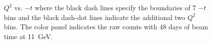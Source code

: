 \begin{figure}[!ht]
 \begin{center}
   \caption[$Q^{2}$ vs. $-t$]{\footnotesize{$Q^{2}$ vs. $-t$ where the black
dash lines specify the boundaries of 7 $-t$ bins and the black dash-dot lines
indicate the additional two $Q^{2}$ bins.  The color panel indicates the raw
counts with 48 days of beam time at 11~GeV.}}
  \label{Q2_t_bin_prd}
  \end{center}
\end{figure}

